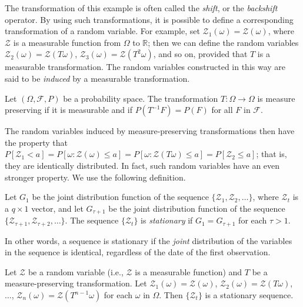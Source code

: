 The transformation of this example is often called the \emph{shift}, or the \emph{backshift} operator. By using such transformations, it is possible to define a corresponding transformation of a random variable. For example, set $\mathcal{Z}_1(\omega) = \mathcal{Z}(\omega)$, where $\mathcal{Z}$ is a measurable function from $\Omega$ to $\mathbb{R}$; then we can define the random variables $\mathcal{Z}_2(\omega) = \mathcal{Z}(T\omega)$, $\mathcal{Z}_3(\omega) = \mathcal{Z}(T^2 \omega)$, and so on, provided that $T$ is a measurable transformation. The random variables constructed in this way are said to be \emph{induced} by a measurable transformation.

\begin{definition}\label{def:measure-preserving}
Let $(\Omega, \mathcal{F}, P)$ be a probability space. The transformation $T : \Omega \to \Omega$ is measure preserving if it is measurable and if $P(T^{-1}F) = P(F)$ for all $F$ in $\mathcal{F}$.
\end{definition}

The random variables induced by measure-preserving transformations then have the property that $P[\mathcal{Z}_1 < a] = P[\omega : \mathcal{Z}(\omega) \leq a] = P[\omega : \mathcal{Z}(T\omega) \leq a] = P[\mathcal{Z}_2 \leq a]$; that is, they are identically distributed. In fact, such random variables have an even stronger property. We use the following definition.

\begin{definition}\label{def:stationary}
Let $G_1$ be the joint distribution function of the sequence $\{\mathcal{Z}_1, \mathcal{Z}_2, \ldots\}$, where $\boldsymbol{\mathcal{Z}}_t$ is a $q \times 1$ vector, and let $G_{\tau+1}$ be the joint distribution function of the sequence $\{\boldsymbol{\mathcal{Z}}_{\tau+1}, \boldsymbol{\mathcal{Z}}_{\tau+2}, \ldots\}$. The sequence $\{\boldsymbol{\mathcal{Z}}_t\}$ is \emph{stationary} if $G_1 = G_{\tau+1}$ for each $\tau > 1$.
\end{definition}

In other words, a sequence is stationary if the \emph{joint} distribution of the variables in the sequence is identical, regardless of the date of the first observation.

\begin{proposition}\label{prop:stationary-mpt}
Let $\mathcal{Z}$ be a random variable (i.e., $\mathcal{Z}$ is a measurable function) and $T$ be a measure-preserving transformation. Let $\mathcal{Z}_1(\omega) = \mathcal{Z}(\omega)$, $\mathcal{Z}_2(\omega) = \mathcal{Z}(T\omega)$, $\ldots$, $\mathcal{Z}_n(\omega) = \mathcal{Z}(T^{n-1}\omega)$ for each $\omega$ in $\Omega$. Then $\{\mathcal{Z}_t\}$ is a stationary sequence.
\end{proposition}

